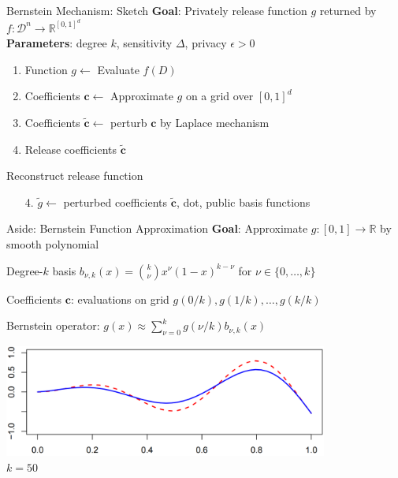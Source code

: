 \documentclass{beamer}
\newcommand{\reals}{\ensuremath{\mathbb{R}}\xspace}
\newcommand{\cD}{\ensuremath{\mathcal{D}}\xspace}
\newcommand{\domain}{\ensuremath{\cD}\xspace}
\begin{document}
\begin{frame}{Bernstein Mechanism: Sketch}
\textbf{Goal}: Privately release function $g$ returned by $f: \domain^n \to \reals^{[0,1]^d}$ \\
\textbf{Parameters}: degree $k$, sensitivity $\Delta$, privacy $\epsilon>0$ \\

\begin{enumerate}
	\pause \item Function $g \longleftarrow$ \alert{Evaluate} $f(D)$
	\pause \item Coefficients $\mathbf{c} \longleftarrow$ \alert{Approximate} $g$ on a grid over $[0,1]^d$
	\pause \item Coefficients $\tilde{\mathbf{c}} \longleftarrow$ \alert{perturb} $\mathbf{c}$ by Laplace mechanism
	\pause \item \alert{Release} coefficients $\tilde{\mathbf{c}}$
\end{enumerate}
\pause \alert{Reconstruct} release function
\begin{enumerate}
	\item[4.] $\tilde{g} \longleftarrow$ perturbed coefficients $\tilde{\mathbf{c}}$, dot, public basis functions
\end{enumerate}
\end{frame}

\begin{frame}{Aside: Bernstein Function Approximation}
\textbf{Goal}: Approximate $g: [0,1]\to\reals$ by smooth polynomial

\pause Degree-$k$ \alert{basis} $b_{\nu,k}(x)={k\choose\nu}x^\nu(1-x)^{k-\nu}$ for $\nu\in\{0,\ldots,k\}$

\pause \alert{Coefficients} $\mathbf{c}$: evaluations on \alert{grid} $g(0/k), g(1/k), \ldots, g(k/k)$

\pause \alert{Bernstein operator}: $g(x)\approx \sum_{\nu=0}^k g(\nu/k) b_{\nu,k}(x)$

\begin{center}\includegraphics[width=0.8\textwidth]{figures/results-bernstein-poly}\\ $k=50$\end{center}
\end{frame}
\end{document}
